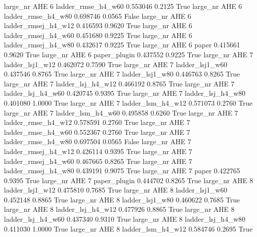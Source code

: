   large_nr      AHE                 6  ladder_rmse_h4_w60   0.553046      0.2125    True
  large_nr      AHE                 6  ladder_rmse_h4_w80   0.698746      0.0565   False
  large_nr      AHE                 6 ladder_rmsej_h4_w12   0.416593      0.9620    True
  large_nr      AHE                 6 ladder_rmsej_h4_w60   0.451680      0.9225    True
  large_nr      AHE                 6 ladder_rmsej_h4_w80   0.432617      0.9225    True
  large_nr      AHE                 6               paper   0.415661      0.9620    True
  large_nr      AHE                 6        paper_plugin   0.437552      0.9225    True
  large_nr      AHE                 7     ladder_lsj1_w12   0.462072      0.7590    True
  large_nr      AHE                 7     ladder_lsj1_w60   0.437546      0.8765    True
  large_nr      AHE                 7     ladder_lsj1_w80   0.446763      0.8265    True
  large_nr      AHE                 7   ladder_lsj_h4_w12   0.466192      0.8765    True
  large_nr      AHE                 7   ladder_lsj_h4_w60   0.420745      0.9395    True
  large_nr      AHE                 7   ladder_lsj_h4_w80   0.401080      1.0000    True
  large_nr      AHE                 7   ladder_lsm_h4_w12   0.571073      0.2760    True
  large_nr      AHE                 7   ladder_lsm_h4_w60   0.495858      0.6260    True
  large_nr      AHE                 7  ladder_rmse_h4_w12   0.578591      0.2760    True
  large_nr      AHE                 7  ladder_rmse_h4_w60   0.552367      0.2760    True
  large_nr      AHE                 7  ladder_rmse_h4_w80   0.697504      0.0565   False
  large_nr      AHE                 7 ladder_rmsej_h4_w12   0.426114      0.9395    True
  large_nr      AHE                 7 ladder_rmsej_h4_w60   0.467665      0.8265    True
  large_nr      AHE                 7 ladder_rmsej_h4_w80   0.439191      0.9075    True
  large_nr      AHE                 7               paper   0.422765      0.9395    True
  large_nr      AHE                 7        paper_plugin   0.444702      0.8265    True
  large_nr      AHE                 8     ladder_lsj1_w12   0.475810      0.7685    True
  large_nr      AHE                 8     ladder_lsj1_w60   0.452148      0.8865    True
  large_nr      AHE                 8     ladder_lsj1_w80   0.460622      0.7685    True
  large_nr      AHE                 8   ladder_lsj_h4_w12   0.477926      0.8865    True
  large_nr      AHE                 8   ladder_lsj_h4_w60   0.437340      0.9310    True
  large_nr      AHE                 8   ladder_lsj_h4_w80   0.411030      1.0000    True
  large_nr      AHE                 8   ladder_lsm_h4_w12   0.584746      0.2695    True
